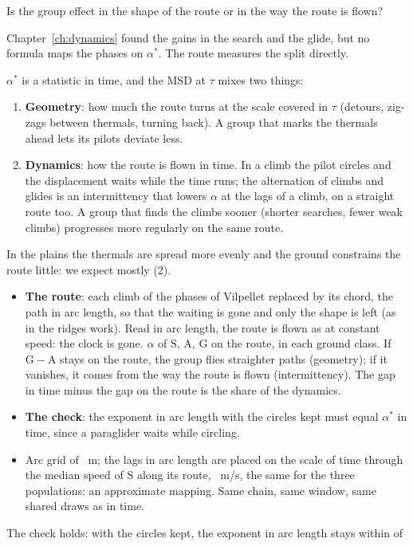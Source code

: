 \documentclass[10pt,a4paper]{article}
\newcommand{\G}{\mathrm{G}}
\newcommand{\A}{\mathrm{A}}
\newcommand{\Sl}{\mathrm{S}}
\newcommand{\Q}{\item[\textcolor{question}{\textbf{Q.}}]\color{question}}
\newcommand{\Res}{\item[\textcolor{answer}{\textbf{Result.}}]\color{black}}
\newcommand{\Hyp}{\item[\textcolor{question}{\textbf{Hypothesis.}}]\color{question}}
\newcommand{\Why}{\item[\textcolor{black}{\textbf{Why.}}]\color{black}}
\newcommand{\Tool}{\item[\textcolor{black}{\textbf{Tool.}}]\color{black}}
\newenvironment{step}{\begin{description}[leftmargin=0pt, itemsep=7pt, topsep=8pt]}{\end{description}}
\begin{document}
\begin{step}
\Q Is the group effect in the shape of the route or in the way the route is flown?
\Why Chapter~\ref{ch:dynamics} found the gains in the search and the glide, but no formula maps the phases on
  $\alpha^*$. The route measures the split directly.
\Hyp $\alpha^*$ is a statistic in time, and the MSD at $\tau$ mixes two things:
  \begin{enumerate}
  \item \textbf{Geometry}: how much the route turns at the scale covered in $\tau$ (detours, zig-zags between
    thermals, turning back). A group that marks the thermals ahead lets its pilots deviate less.
  \item \textbf{Dynamics}: how the route is flown in time. In a climb the pilot circles and the displacement
    waits while the time runs; the alternation of climbs and glides is an intermittency that lowers $\alpha$
    at the lags of a climb, on a straight route too. A group that finds the climbs sooner (shorter searches,
    fewer weak climbs) progresses more regularly on the same route.
  \end{enumerate}
  In the plains the thermals are spread more evenly and the ground constrains the route little: we expect
  mostly (2).
\Tool\mbox{}
  \begin{itemize}
  \item \textbf{The route}: each climb of the phases of Vilpellet replaced by its chord, the path in arc
    length, so that the waiting is gone and only the shape is left (as in the ridges work). Read in arc length,
    the route is flown as at constant speed: the clock is gone. $\alpha$ of $\Sl$,
    $\A$, $\G$ on the route, in each ground class. If $\G-\A$ stays on the route, the group flies straighter
    paths (geometry); if it vanishes, it comes from the way the route is flown (intermittency). The gap in time
    minus the gap on the route is the share of the dynamics.
  \item \textbf{The check}: the exponent in arc length with the circles kept must equal $\alpha^*$ in time, since a
    paraglider waits while circling.
  \item Arc grid of \RouteDs~m; the lags in arc length are placed on the scale of time through the median speed of
    $\Sl$ along its route, \RouteSpeed~m/s, the same for the three populations: an approximate mapping. Same chain, same
    window, same shared draws as in time.
  \end{itemize}
\Res The check holds: with the circles kept, the exponent in arc length stays within \RouteCheckMax{} of

\end{step}
\end{document}
